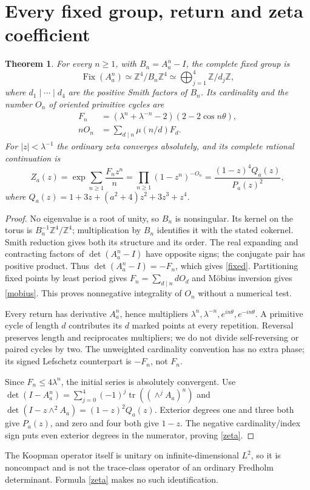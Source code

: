 \documentclass[10pt]{article}
\newtheorem{theorem}{Theorem}
\newcommand{\Fix}{\operatorname{Fix}}
\newcommand{\tr}{\operatorname{tr}}
\begin{document}
\section{Every fixed group, return and zeta coefficient}
\begin{theorem}
For every $n\ge1$, with $B_n=A_a^n-I$, the complete fixed group is
\[
 \Fix(A_a^n)\simeq\mathbb Z^4/B_n\mathbb Z^4
 \simeq\bigoplus_{j=1}^4\mathbb Z/d_j\mathbb Z,
\]
where $d_1\mid\cdots\mid d_4$ are the positive Smith factors of $B_n$.
Its cardinality and the number $O_n$ of oriented primitive cycles are
\begin{align}
 F_n&=(\lambda^n+\lambda^{-n}-2)(2-2\cos n\theta),\label{fixed}\\
 nO_n&=\sum_{d\mid n}\mu(n/d)F_d.\label{mobius}
\end{align}
For $|z|<\lambda^{-1}$ the ordinary zeta converges absolutely, and its
complete rational continuation is
\begin{equation}\label{zeta}
 Z_a(z)=\exp\sum_{n\ge1}\frac{F_nz^n}{n}
 =\prod_{n\ge1}(1-z^n)^{-O_n}
 =\frac{(1-z)^4 Q_a(z)}{P_a(z)^2},
\end{equation}
where $Q_a(z)=1+3z+(a^2+4)z^2+3z^3+z^4$.
\end{theorem}
\begin{proof}
No eigenvalue is a root of unity, so $B_n$ is nonsingular.
Its kernel on the torus is $B_n^{-1}\mathbb Z^4/\mathbb Z^4$;
multiplication by $B_n$ identifies it with the stated cokernel.
Smith reduction gives both its structure and its order.
The real expanding and contracting factors of $\det(A_a^n-I)$ have
opposite signs; the conjugate pair has positive product. Thus
$\det(A_a^n-I)=-F_n$, which gives \eqref{fixed}.
Partitioning fixed points by least period gives
$F_n=\sum_{d\mid n}dO_d$ and Möbius inversion gives \eqref{mobius}.
This proves nonnegative integrality of $O_n$ without a numerical test.

Every return has derivative $A_a^n$, hence multipliers
$\lambda^n,\lambda^{-n},e^{in\theta},e^{-in\theta}$.
A primitive cycle of length $d$ contributes its $d$ marked points at
every repetition. Reversal preserves length and reciprocates multipliers;
we do not divide self-reversing or paired cycles by two. The unweighted
cardinality convention has no extra phase; its signed Lefschetz counterpart
is $-F_n$, not $F_n$.

Since $F_n\le4\lambda^n$, the initial series is absolutely convergent.
Use $\det(I-A_a^n)=\sum_{j=0}^4(-1)^j\tr((\wedge^jA_a)^n)$ and
$\det(I-z\wedge^2A_a)=(1-z)^2Q_a(z)$.
Exterior degrees one and three both give $P_a(z)$, and zero and four
both give $1-z$. The negative cardinality/index sign puts even exterior
degrees in the numerator, proving \eqref{zeta}.
\end{proof}
The Koopman operator itself is unitary on infinite-dimensional $L^2$,
so it is noncompact and is not the trace-class operator of an ordinary
Fredholm determinant. Formula \eqref{zeta} makes no such identification.
\end{document}
